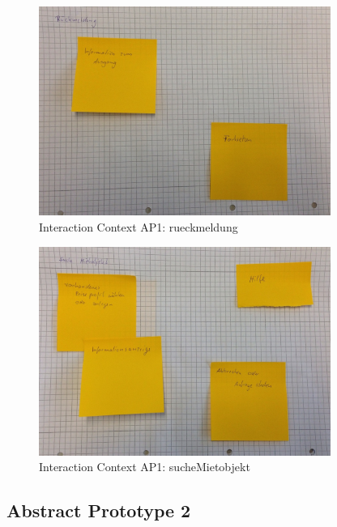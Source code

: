 \begin{figure}[H]
\centering
\includegraphics[width=0.85\textwidth]{./images/abstract/version1/rueckmeldung.JPG}
\caption{Interaction Context AP1: rueckmeldung}
\label{interfaceContents30}
\end{figure}

\begin{figure}[H]
\centering
\includegraphics[width=0.85\textwidth]{./images/abstract/version1/sucheMietobjekt.JPG}
\caption{Interaction Context AP1: sucheMietobjekt}
\label{interfaceContents31}
\end{figure}


\newpage
\subsection{Abstract Prototype 2}

